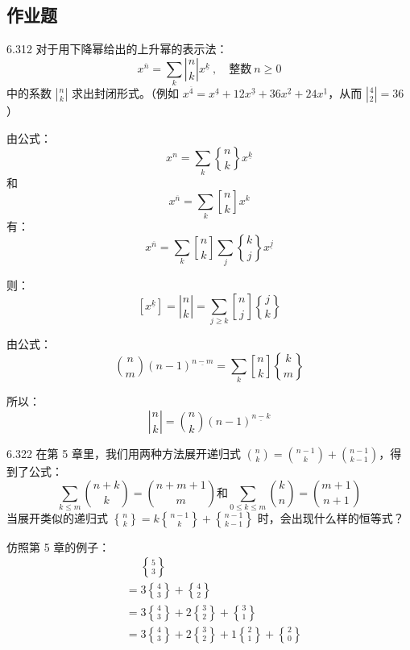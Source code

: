 \subsection{作业题}

\begin{problem}{6.31}{2}
  对于用下降幂给出的上升幂的表示法：
  \[
    x^{\overline{n}} = \sum_k \genfrac{|}{|}{0pt}{} {n}{k} x^{\underline{k}} \ , \quad \text{整数} \ n \geqslant 0
  \]
  中的系数 \( \displaystyle\genfrac{|}{|}{0pt}{} {n}{k} \) 求出封闭形式。（例如 \( x^{\overline{4}} = x^{\underline{4}} + 12 x^{\underline{3}} + 36 x^{\underline{2}} + 24 x^{\underline{1}} \)，从而 \( \displaystyle\genfrac{|}{|}{0pt}{} {4}{2} = 36 \)）
\end{problem}

由公式：
\[
  \boxed{x^n = \sum_k \genfrac{\{}{\}}{0pt}{} {n}{k} x^{\underline{k}}}
\]
和
\[
  \boxed{x^{\overline{n}} = \sum_k \genfrac{[}{]}{0pt}{} {n}{k} x^k}
\]
有：
\[
  x^{\overline{n}} = \sum_k \genfrac{[}{]}{0pt}{} {n}{k} \sum_j \genfrac{\{}{\}}{0pt}{} {k}{j} x^{\underline{j}}
\]

则：
\[
  [x^{\underline{k}}] = \genfrac{|}{|}{0pt}{} {n}{k} = \sum_{j \geqslant k} \genfrac{[}{]}{0pt}{} {n}{j} \genfrac{\{}{\}}{0pt}{} {j}{k}
\]

由公式：
\[
  \boxed{\binom{n}{m}(n-1)^{\underline{n-m}} = \sum_k \genfrac{[}{]}{0pt}{} {n}{k} \genfrac{\{}{\}}{0pt}{} {k}{m}}
\]

所以：
\[
  \genfrac{|}{|}{0pt}{} {n}{k} = \binom{n}{k} (n-1)^{\underline{n-k}}
\]

\begin{problem}{6.32}{2}
  在第 5 章里，我们用两种方法展开递归式 \( \displaystyle\binom{n}{k} = \binom{n-1}{k} + \binom{n-1}{k-1} \)，得到了公式：
  \[
    \sum_{k \leqslant m} \binom{n+k}{k} = \binom{n+m+1}{m} \text{和} \sum_{0 \leqslant k \leqslant m} \binom{k}{n} = \binom{m+1}{n+1}
  \]
  当展开类似的递归式 \( \displaystyle\genfrac{\{}{\}}{0pt}{} {n}{k} = k \genfrac{\{}{\}}{0pt}{} {n-1}{k} + \genfrac{\{}{\}}{0pt}{} {n-1}{k-1} \) 时，会出现什么样的恒等式？
\end{problem}

仿照第 5 章的例子：
\begin{align*}
  &\phantom{=} \genfrac{\{}{\}}{0pt}{} {5}{3} \\
  &= 3 \genfrac{\{}{\}}{0pt}{} {4}{3} + \genfrac{\{}{\}}{0pt}{} {4}{2} \\
  &= 3 \genfrac{\{}{\}}{0pt}{} {4}{3} + 2 \genfrac{\{}{\}}{0pt}{} {3}{2} + \genfrac{\{}{\}}{0pt}{} {3}{1} \\
  &= 3 \genfrac{\{}{\}}{0pt}{} {4}{3} + 2 \genfrac{\{}{\}}{0pt}{} {3}{2} + 1 \genfrac{\{}{\}}{0pt}{} {2}{1} + \genfrac{\{}{\}}{0pt}{} {2}{0}
\end{align*}

